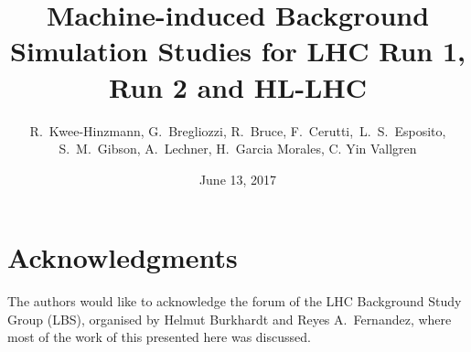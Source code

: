 \documentclass{cernatsreport}    %
\title{Machine-induced Background Simulation Studies 
  for LHC Run 1, Run 2 and HL-LHC}
\author{R.~Kwee-Hinzmann, G.~Bregliozzi, R.~Bruce, F.~Cerutti,~L.~S.~Esposito, \\S.~M.~Gibson, A.~Lechner, H.~Garcia Morales, C. Yin Vallgren}
\date{June 13, 2017}
\begin{document}


\maketitle                 %

\tableofcontents
\newpage
\newpage









\section*{Acknowledgments}
The authors would like to acknowledge the forum of the LHC Background Study Group (LBS), organised by Helmut Burkhardt and Reyes A.~Fernandez, where most of the work of this presented here was discussed.

\clearpage
\appendix
\newpage
\clearpage
\newpage
\newpage

\newpage

        
        
\end{document}
